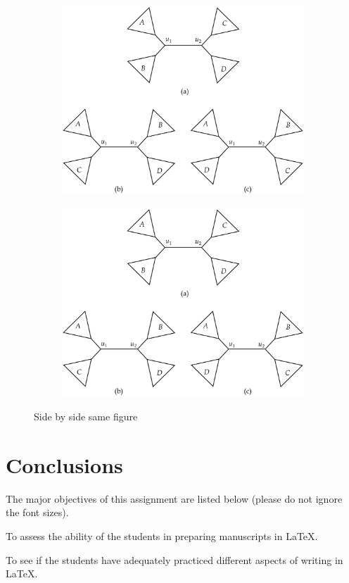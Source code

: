 \documentclass[12pt, a4paper]{article} %
\begin{document}
	\begin{figure}[h!]
		\centering
		\begin{subfigure}{0.5\textwidth}
			\centering
			\includegraphics[width=.5\linewidth]{Figure.pdf}		
			
		\end{subfigure}%
		\begin{subfigure}{0.5\textwidth}
			\centering
			\includegraphics[width=.5\linewidth]{Figure.pdf}
		\end{subfigure}
		\caption{Side by side same figure}
	\end{figure}
	
	\section{Conclusions}
	The major objectives of this assignment are listed below (please do not ignore \\
	the font sizes).
	
	\begin{itemize}
		\Large{\item To assess the ability of the students in preparing
		manuscripts in \LaTeX.}
		\large{\item To see if the students have adequately practiced different
			aspects of writing in \LaTeX.}
	\end{itemize}
	
\end{document}
